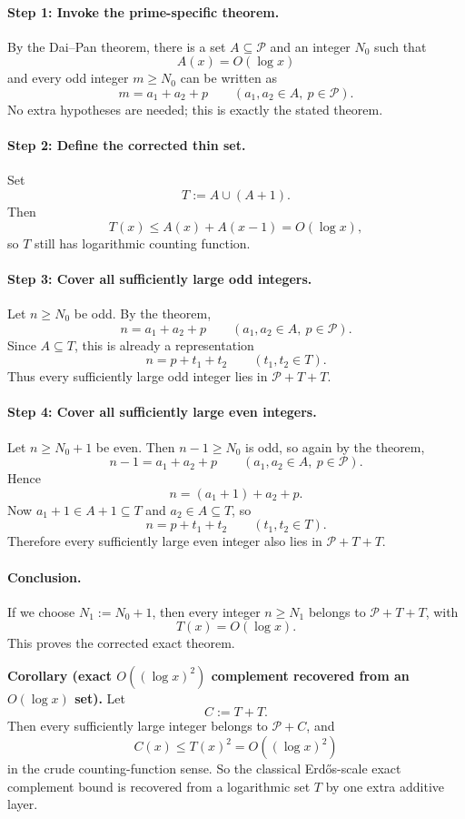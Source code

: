 \paragraph{Step 1: Invoke the prime-specific theorem.}
By the Dai--Pan theorem, there is a set $A\subseteq \mathcal P$ and an integer $N_0$ such that
\[
A(x)=O(\log x)
\]
and every odd integer $m\ge N_0$ can be written as
\[
 m=a_1+a_2+p
 \qquad (a_1,a_2\in A,\ p\in\mathcal P).
\]
No extra hypotheses are needed; this is exactly the stated theorem.

\paragraph{Step 2: Define the corrected thin set.}
Set
\[
T:=A\cup (A+1).
\]
Then
\[
T(x)\le A(x)+A(x-1)=O(\log x),
\]
so $T$ still has logarithmic counting function.

\paragraph{Step 3: Cover all sufficiently large odd integers.}
Let $n\ge N_0$ be odd.  By the theorem,
\[
 n=a_1+a_2+p
 \qquad (a_1,a_2\in A,\ p\in\mathcal P).
\]
Since $A\subseteq T$, this is already a representation
\[
 n=p+t_1+t_2
 \qquad (t_1,t_2\in T).
\]
Thus every sufficiently large odd integer lies in $\mathcal P+T+T$.

\paragraph{Step 4: Cover all sufficiently large even integers.}
Let $n\ge N_0+1$ be even.  Then $n-1\ge N_0$ is odd, so again by the theorem,
\[
 n-1=a_1+a_2+p
 \qquad (a_1,a_2\in A,\ p\in\mathcal P).
\]
Hence
\[
 n=(a_1+1)+a_2+p.
\]
Now $a_1+1\in A+1\subseteq T$ and $a_2\in A\subseteq T$, so
\[
 n=p+t_1+t_2
 \qquad (t_1,t_2\in T).
\]
Therefore every sufficiently large even integer also lies in $\mathcal P+T+T$.

\paragraph{Conclusion.}
If we choose $N_1:=N_0+1$, then every integer $n\ge N_1$ belongs to $\mathcal P+T+T$, with
\[
T(x)=O(\log x).
\]
This proves the corrected exact theorem.

\medskip
\noindent
\textbf{Corollary (exact $O((\log x)^2)$ complement recovered from an $O(\log x)$ set).}
Let
\[
C:=T+T.
\]
Then every sufficiently large integer belongs to $\mathcal P+C$, and
\[
C(x)\le T(x)^2=O((\log x)^2)
\]
in the crude counting-function sense.  So the classical Erd\H{o}s-scale exact complement bound is recovered from a logarithmic set $T$ by one extra additive layer.

